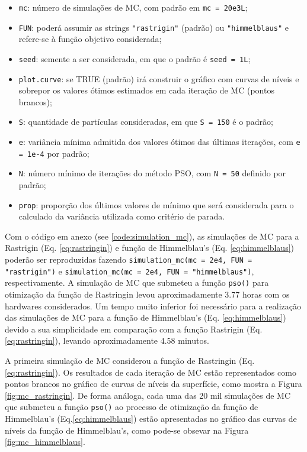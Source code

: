 \documentclass[10pt,letterpaper]{article}
\begin{document}
\begin{itemize}
	\item \texttt{mc}: número de simulações de MC, com padrão em \texttt{mc = 20e3L};
	\item \texttt{FUN}: poderá assumir as strings \texttt{"rastrigin"} (padrão) ou \texttt{"himmelblaus"} e refere-se à função objetivo considerada;
	\item \texttt{seed}: semente a ser considerada, em que o padrão é \texttt{seed = 1L};
	\item \texttt{plot.curve}: se TRUE (padrão) irá construir o gráfico com  curvas de níveis e sobrepor os valores ótimos estimados em cada iteração de MC (pontos brancos);
	\item \texttt{S}: quantidade de partículas consideradas, em que \texttt{S = 150} é o padrão;
	\item \texttt{e}: variância mínima admitida dos valores ótimos das últimas iterações, com \texttt{e = 1e-4} por padrão;
	\item \texttt{N}: número mínimo de iterações do método PSO, com \texttt{N = 50} definido por padrão;
	\item \texttt{prop}: proporção dos últimos valores de mínimo que será considerada para o calculado da variância utilizada como critério de parada.
\end{itemize} 

Com o código em anexo (see \ref{code:simulation_mc}), as simulações de MC para a Rastrigin (Eq. \ref{eq:rastringin}) e função de Himmelblau's (Eq. \ref{eq:himmelblaus}) poderão ser reproduzidas fazendo \texttt{simulation\_mc(mc = 2e4, FUN = "rastrigin")} e \texttt{simulation\_mc(mc = 2e4, FUN = "himmelblaus")}, respectivamente. A simulação de MC que submeteu a função \texttt{pso()} para otimização da função de Rastringin levou aproximadamente 3.77 horas com os hardwares considerados. Um tempo muito inferior foi necessário para a realização das simulações de MC para a função de Himmelblau's (Eq. \ref{eq:himmelblaus}) devido a sua simplicidade em comparação com a função Rastrigin (Eq. \ref{eq:rastringin}), levando aproximadamente 4.58 minutos.

A primeira simulação de MC considerou a função de Rastringin (Eq. \ref{eq:rastringin}). Os resultados de cada iteração de MC estão representados como pontos brancos no gráfico de curvas de níveis da superfície, como mostra a Figura \ref{fig:mc_rastringin}. De forma análoga, cada uma das 20 mil simulações de MC que submeteu a função \texttt{pso()} ao processo de otimização da função de Himmelblau's (Eq.\ref{eq:himmelblaus}) estão apresentadas no gráfico das curvas de níveis da função de Himmelblau's, como pode-se obsevar na Figura \ref{fig:mc_himmelblaus}.
\end{document}
